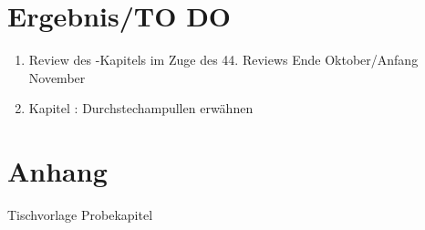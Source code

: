 \documentclass[
ngerman,
paper=a4,
asymmetric,
fontsize=10pt,
draft=false,
numbers=noenddot,
bibtotocnumbered,
footnotes=multiple,
]{scrreprt}
\begin{document}
\chapter{Ergebnis/TO DO}
\begin{enumerate}
  \item Review des \CC{[PAM]}-Kapitels im Zuge des 44. Reviews Ende
  Oktober/Anfang November
  \item Kapitel \CC{[ASS]}: Durchstechampullen erwähnen
\end{enumerate}

\appendix
\chapter{Anhang}
Tischvorlage Probekapitel \CC{[PAM]}

\end{document}
